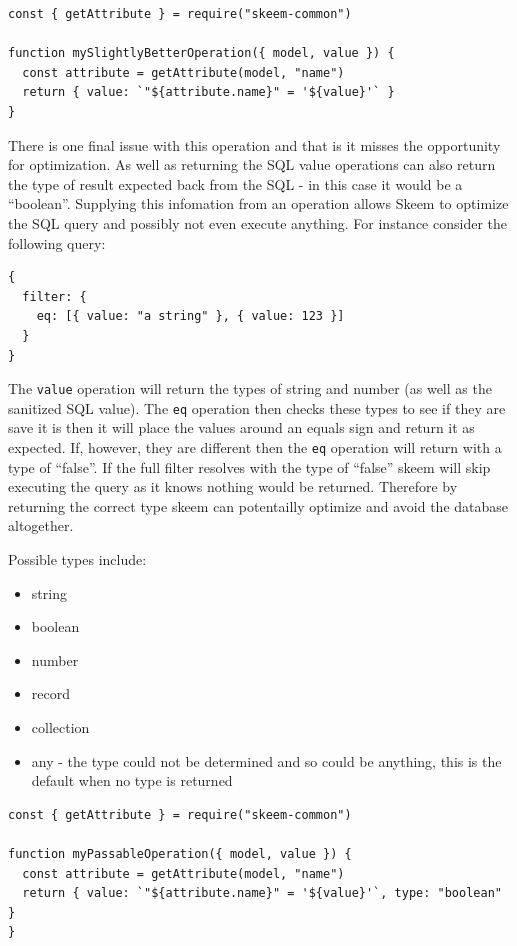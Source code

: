 \documentclass[
  12pt,
]{article}
\newcommand{\passthrough}[1]{#1}
\providecommand{\tightlist}{%
  \setlength{\itemsep}{0pt}\setlength{\parskip}{0pt}}
\begin{document}
\begin{lstlisting}[caption={Checks to see if name actually exists on the model being queried.}]
const { getAttribute } = require("skeem-common")

function mySlightlyBetterOperation({ model, value }) {
  const attribute = getAttribute(model, "name")
  return { value: `"${attribute.name}" = '${value}'` }
}
\end{lstlisting}

There is one final issue with this operation and that is it misses the
opportunity for optimization. As well as returning the SQL value
operations can also return the type of result expected back from the SQL
- in this case it would be a ``boolean''. Supplying this infomation from
an operation allows Skeem to optimize the SQL query and possibly not
even execute anything. For instance consider the following query:

\begin{lstlisting}
{
  filter: {
    eq: [{ value: "a string" }, { value: 123 }]
  }
}
\end{lstlisting}

The \passthrough{\lstinline!value!} operation will return the types of
string and number (as well as the sanitized SQL value). The
\passthrough{\lstinline!eq!} operation then checks these types to see if
they are save it is then it will place the values around an equals sign
and return it as expected. If, however, they are different then the
\passthrough{\lstinline!eq!} operation will return with a type of
``false''. If the full filter resolves with the type of ``false'' skeem
will skip executing the query as it knows nothing would be returned.
Therefore by returning the correct type skeem can potentailly optimize
and avoid the database altogether.

Possible types include:

\begin{itemize}
\tightlist
\item
  string
\item
  boolean
\item
  number
\item
  record
\item
  collection
\item
  any - the type could not be determined and so could be anything, this
  is the default when no type is returned
\end{itemize}

\begin{lstlisting}[caption={Checks to see if the attribute actually exists and returns the correct type}]
const { getAttribute } = require("skeem-common")

function myPassableOperation({ model, value }) {
  const attribute = getAttribute(model, "name")
  return { value: `"${attribute.name}" = '${value}'`, type: "boolean" }
}
\end{lstlisting}
\end{document}

